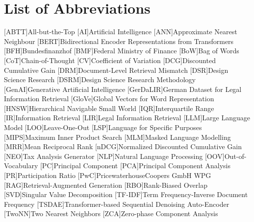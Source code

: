 \clearpage
\chapter*{List of Abbreviations}    

\begin{acronym}[GerDaLIR]
    [ABTT]{All-but-the-Top}
    [AI]{Artificial Intelligence}
    [ANN]{Approximate Nearest Neighbour}
    [BERT]{Bidirectional Encoder Representations from Transformers}
    [BFH]{Bundesfinanzhof}
    [BMF]{Federal Ministry of Finance}
    [BoW]{Bag of Words}
    [CoT]{Chain-of-Thought}
    [CV]{Coefficient of Variation}
    [DCG]{Discounted Cumulative Gain}
    [DRM]{Document-Level Retrieval Mismatch}
    [DSR]{Design Science Research}
    [DSRM]{Design Science Research Methodology}
    [GenAI]{Generative Artificial Intelligence}
    [GerDaLIR]{German Dataset for Legal Information Retrieval}
    [GloVe]{Global Vectors for Word Representation}
    [HNSW]{Hierarchical Navigable Small World}
    [IQR]{Interquartile Range}
    [IR]{Information Retrieval}
    [LIR]{Legal Information Retrieval}
    [LLM]{Large Language Model}
    [LOO]{Leave-One-Out}
    [LSP]{Language for Specific Purposes}
    [MIPS]{Maximum Inner Product Search}
    [MLM]{Masked Language Modelling}
    [MRR]{Mean Reciprocal Rank}
    [nDCG]{Normalized Discounted Cumulative Gain}
    [NEO]{Tax Analysis Generator}
    [NLP]{Natural Language Processing}
    [OOV]{Out-of-Vocabulary}
    [PC]{Principal Component}
    [PCA]{Principal Component Analysis}
    [PR]{Participation Ratio}
    [PwC]{PricewaterhouseCoopers GmbH WPG}
    [RAG]{Retrieval-Augmented Generation}
    [RBO]{Rank-Biased Overlap}
    [SVD]{Singular Value Decomposition}
    [TF-IDF]{Term Frequency-Inverse Document Frequency}
    [TSDAE]{Transformer-based Sequential Denoising Auto-Encoder}
    [TwoNN]{Two Nearest Neighbors}
    [ZCA]{Zero-phase Component Analysis}
\end{acronym}
